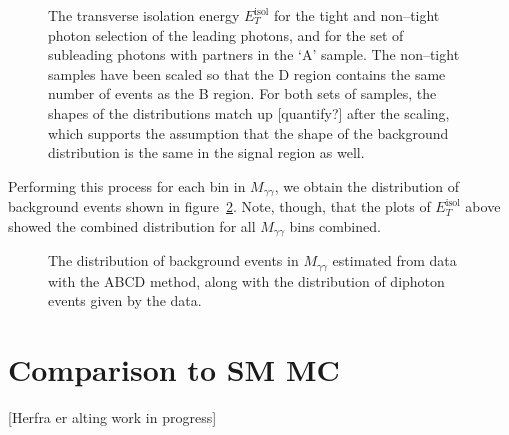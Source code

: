 \begin{figure}[htp]
\begin{minipage}[b]{.69\textwidth}
\begin{infilsf} \tiny 

\end{infilsf}
\end{minipage}\hfill\begin{minipage}[b]{.3\textwidth}
\caption{The transverse isolation energy $E_T^{\text{isol}}$ for the tight and non--tight photon selection of the leading photons, and for the set of subleading photons with partners in the `A' sample. The non--tight samples have been scaled so that the D region contains the same number of events as the B region. For both sets of samples, the shapes of the distributions match up [quantify?] after the scaling, which supports the assumption that the shape of the background distribution is the same in the signal region as well.
\label{etiso}}
\end{minipage}
\end{figure}

Performing this process for each bin in $M_{\gamma\gamma}$, we obtain the distribution of background events shown in figure~\ref{mggbck}. Note, though, that the plots of $E_T^{\text{isol}}$ above showed the combined distribution for all $M_{\gamma\gamma}$ bins combined.

\begin{figure}[htp]
\begin{minipage}[b]{.69\textwidth}
\begin{infilsf} \tiny 

\end{infilsf}
\end{minipage}\hfill\begin{minipage}[b]{.3\textwidth}
\caption{The distribution of background events in $M_{\gamma\gamma}$ estimated from data with the ABCD method, along with the distribution of diphoton events given by the data.
\label{mggbck}}
\end{minipage}
\end{figure}

\section{Comparison to SM MC}
[Herfra er alting work in progress]

